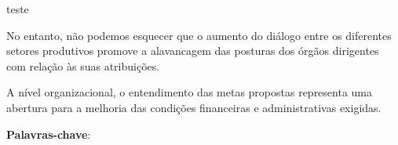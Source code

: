 \documentclass[
	12pt,				%
	oneside,			%
	a4paper,			%
	english,			%
	french,				%
	spanish,			%
	brazil				%
	]{abntex2}
\begin{document}

\frenchspacing


\imprimircapa



\imprimirfolhaderosto





\begin{dedicatoria}
   \vspace*{\fill}
   \centering
   \noindent

    teste

   \vspace*{\fill}
\end{dedicatoria}
\begin{agradecimentos}

No entanto, não podemos esquecer que o aumento do diálogo entre os
diferentes setores produtivos promove a alavancagem das posturas dos
órgãos dirigentes com relação às suas atribuições.

\end{agradecimentos}



\setlength{\absparsep}{18pt} %
\begin{resumo}

  A nível organizacional, o entendimento das metas propostas representa
  uma abertura para a melhoria das condições financeiras e administrativas
  exigidas.

 \textbf{Palavras-chave}: 
\end{resumo}
\end{document}
